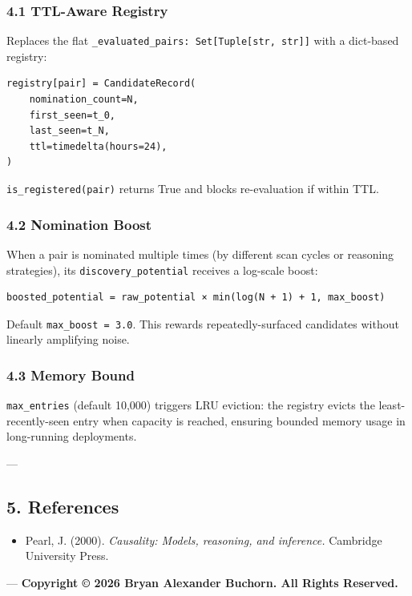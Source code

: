 \subsubsection{4.1 TTL-Aware Registry}

Replaces the flat \texttt{\_evaluated\_pairs: Set[Tuple[str, str]]} with a dict-based registry:

\begin{lstlisting}
registry[pair] = CandidateRecord(
    nomination_count=N,
    first_seen=t_0,
    last_seen=t_N,
    ttl=timedelta(hours=24),
)
\end{lstlisting}

\texttt{is\_registered(pair)} returns True and blocks re-evaluation if within TTL.

\subsubsection{4.2 Nomination Boost}

When a pair is nominated multiple times (by different scan cycles or reasoning strategies), its \texttt{discovery\_potential} receives a log-scale boost:

\begin{lstlisting}
boosted_potential = raw_potential × min(log(N + 1) + 1, max_boost)
\end{lstlisting}

Default \texttt{max\_boost = 3.0}. This rewards repeatedly-surfaced candidates without linearly amplifying noise.

\subsubsection{4.3 Memory Bound}

\texttt{max\_entries} (default 10,000) triggers LRU eviction: the registry evicts the least-recently-seen entry when capacity is reached, ensuring bounded memory usage in long-running deployments.

---

\subsection{5. References}

\begin{itemize}
\item [pearl\-2000\-causality] Pearl, J. (2000). \textit{Causality: Models, reasoning, and inference.} Cambridge University Press.

\end{itemize}
---
\textbf{Copyright © 2026 Bryan Alexander Buchorn. All Rights Reserved.}

